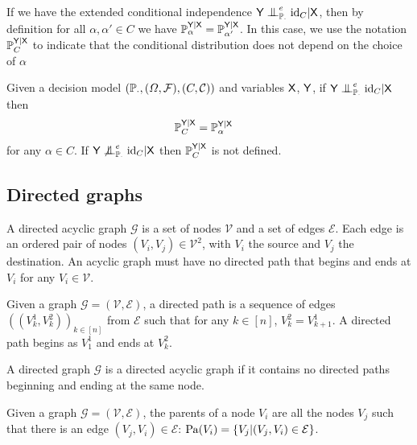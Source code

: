 If we have the extended conditional independence $\RV{Y}\CI^e_{\prob{P}_\cdot} \mathrm{id}_C | \RV{X}$, then by definition for all $\alpha,\alpha'\in C$ we have $\mathbb{P}_\alpha^{\mathsf{Y}|\mathsf{X}}=\mathbb{P}_{\alpha'}^{\mathsf{Y}|\mathsf{X}}$. In this case, we use the notation $\mathbb{P}_C^{\mathsf{Y}|\mathsf{X}}$ to indicate that the conditional distribution does not depend on the choice of $\alpha$

\begin{definition}\label{def:uci}
Given a decision model $(\mathbb{P}_\cdot, (\Omega,\mathcal{F}), (C,\mathcal{C}))$ and variables $\mathsf{X}$, $\mathsf{Y}$, if $\RV{Y}\CI^e_{\prob{P}_\cdot} \mathrm{id}_C | \RV{X}$ then
\begin{align}
    \mathbb{P}_C^{\mathsf{Y}|\mathsf{X}} &= \mathbb{P}_\alpha^{\mathsf{Y}|\mathsf{X}}
\end{align}
for any $\alpha\in C$. If $\RV{Y}\not \CI^e_{\prob{P}_\cdot} \mathrm{id}_C | \RV{X}$ then $\mathbb{P}_C^{\mathsf{Y}|\mathsf{X}}$ is not defined.
\end{definition}

\subsection{Directed graphs}\label{sec:d_graphs}


\begin{definition}
A directed acyclic graph $\mathcal{G}$ is a set of nodes $\mathcal{V}$ and a set of edges $\mathcal{E}$. Each edge is an ordered pair of nodes $(V_i,V_j)\in \mathcal{V}^2$, with $V_i$ the source and $V_j$ the destination. An acyclic graph must have no directed path that begins and ends at $V_i$ for any $V_i\in\mathcal{V}$.
\end{definition}

\begin{definition}
Given a graph $\mathcal{G}=(\mathcal{V},\mathcal{E})$, a directed path is a sequence of edges $((V^1_{k},V^2_{k}))_{k\in [n]}$ from $\mathcal{E}$ such that for any $k\in [n]$, $V^2_k=V^1_{k+1}$. A directed path begins as $V^1_1$ and ends at $V^2_k$.
\end{definition}

\begin{definition}
A directed graph $\mathcal{G}$ is a directed acyclic graph if it contains no directed paths beginning and ending at the same node.
\end{definition}

\begin{definition}[Parents]
Given a graph $\mathcal{G}=(\mathcal{V},\mathcal{E})$, the parents of a node $V_i$ are all the nodes $V_j$ such that there is an edge $(V_j, V_i)\in \mathcal{E}$: $\mathrm{Pa}(V_i)=\{V_j|(V_j,V_i)\in \mathcal{E}\}$.
\end{definition}

